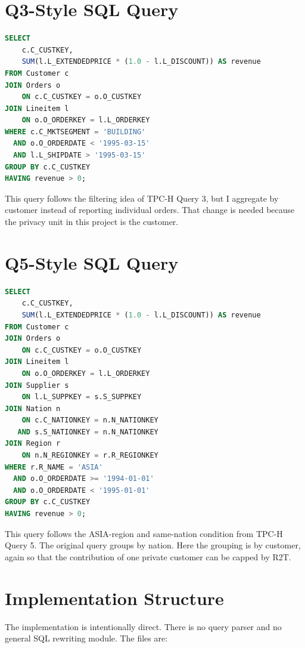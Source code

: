 \documentclass[12pt,a4paper]{report}
\begin{document}
\section{Q3-Style SQL Query}

\begin{lstlisting}[language=SQL]
SELECT
    c.C_CUSTKEY,
    SUM(l.L_EXTENDEDPRICE * (1.0 - l.L_DISCOUNT)) AS revenue
FROM Customer c
JOIN Orders o
    ON c.C_CUSTKEY = o.O_CUSTKEY
JOIN Lineitem l
    ON o.O_ORDERKEY = l.L_ORDERKEY
WHERE c.C_MKTSEGMENT = 'BUILDING'
  AND o.O_ORDERDATE < '1995-03-15'
  AND l.L_SHIPDATE > '1995-03-15'
GROUP BY c.C_CUSTKEY
HAVING revenue > 0;
\end{lstlisting}

This query follows the filtering idea of TPC-H Query 3, but I aggregate
by customer instead of reporting individual orders.  That change is
needed because the privacy unit in this project is the customer.

\section{Q5-Style SQL Query}

\begin{lstlisting}[language=SQL]
SELECT
    c.C_CUSTKEY,
    SUM(l.L_EXTENDEDPRICE * (1.0 - l.L_DISCOUNT)) AS revenue
FROM Customer c
JOIN Orders o
    ON c.C_CUSTKEY = o.O_CUSTKEY
JOIN Lineitem l
    ON o.O_ORDERKEY = l.L_ORDERKEY
JOIN Supplier s
    ON l.L_SUPPKEY = s.S_SUPPKEY
JOIN Nation n
    ON c.C_NATIONKEY = n.N_NATIONKEY
   AND s.S_NATIONKEY = n.N_NATIONKEY
JOIN Region r
    ON n.N_REGIONKEY = r.R_REGIONKEY
WHERE r.R_NAME = 'ASIA'
  AND o.O_ORDERDATE >= '1994-01-01'
  AND o.O_ORDERDATE < '1995-01-01'
GROUP BY c.C_CUSTKEY
HAVING revenue > 0;
\end{lstlisting}

This query follows the ASIA-region and same-nation condition from TPC-H
Query 5.  The original query groups by nation.  Here the grouping is by
customer, again so that the contribution of one private customer can be
capped by R2T.

\section{Implementation Structure}

The implementation is intentionally direct.  There is no query parser and
no general SQL rewriting module.  The files are:
\end{document}
